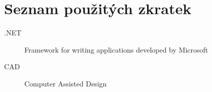 \chapter{Seznam použitých zkratek}
\label{ch:abbreviations}

\begin{description}
    \item[.NET] Framework for writing applications developed by Microsoft
    \item[CAD] Computer Assisted Design

\end{description}